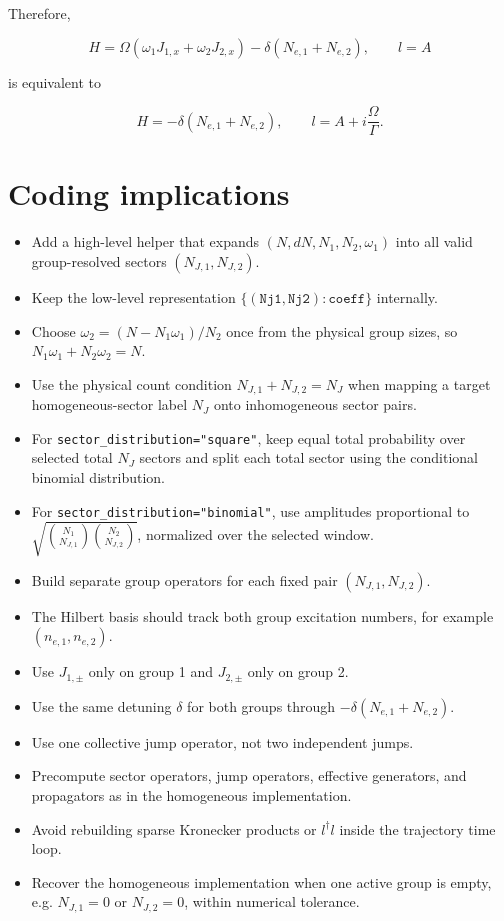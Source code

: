 \documentclass[11pt]{article}
\begin{document}
Therefore,

\begin{equation}
H=
\Omega(\omega_1J_{1,x}+\omega_2J_{2,x})
-
\delta(N_{e,1}+N_{e,2}),
\qquad
l=A
\end{equation}

is equivalent to

\begin{equation}
H=-\delta(N_{e,1}+N_{e,2}),
\qquad
l=A+i\frac{\Omega}{\Gamma}.
\end{equation}

\section*{Coding implications}

\begin{itemize}
\item Add a high-level helper that expands \((N,dN,N_1,N_2,\omega_1)\) into all
  valid group-resolved sectors \((N_{J,1},N_{J,2})\).
\item Keep the low-level representation
  \(\{(\texttt{Nj1},\texttt{Nj2}):\texttt{coeff}\}\) internally.
\item Choose \(\omega_2=(N-N_1\omega_1)/N_2\) once from the physical group sizes,
  so \(N_1\omega_1+N_2\omega_2=N\).
\item Use the physical count condition \(N_{J,1}+N_{J,2}=N_J\) when mapping a
  target homogeneous-sector label \(N_J\) onto inhomogeneous sector pairs.
\item For \texttt{sector\_distribution="square"}, keep equal total probability
  over selected total \(N_J\) sectors and split each total sector using the
  conditional binomial distribution.
\item For \texttt{sector\_distribution="binomial"}, use amplitudes proportional
  to
  \(\sqrt{\binom{N_1}{N_{J,1}}\binom{N_2}{N_{J,2}}}\), normalized over the
  selected window.
\item Build separate group operators for each fixed pair \((N_{J,1},N_{J,2})\).
\item The Hilbert basis should track both group excitation numbers, for example
  \((n_{e,1},n_{e,2})\).
\item Use \(J_{1,\pm}\) only on group 1 and \(J_{2,\pm}\) only on group 2.
\item Use the same detuning \(\delta\) for both groups through
  \(-\delta(N_{e,1}+N_{e,2})\).
\item Use one collective jump operator, not two independent jumps.
\item Precompute sector operators, jump operators, effective generators, and
  propagators as in the homogeneous implementation.
\item Avoid rebuilding sparse Kronecker products or \(l^\dagger l\) inside the
  trajectory time loop.
\item Recover the homogeneous implementation when one active group is empty,
  e.g. \(N_{J,1}=0\) or \(N_{J,2}=0\), within numerical tolerance.
\end{itemize}
\end{document}
